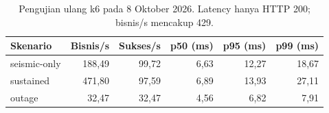\begin{table}[H]\centering\small
\begin{tabular}{lrrrrr}\toprule
Skenario & Bisnis/s & Sukses/s & p50 (ms) & p95 (ms) & p99 (ms)\\\midrule
seismic-only & 188,49 & 99,72 & 6,63 & 12,27 & 18,67\\
sustained & 471,80 & 97,59 & 6,89 & 13,93 & 27,11\\
outage & 32,47 & 32,47 & 4,56 & 6,82 & 7,91\\
\bottomrule\end{tabular}
\caption{Pengujian ulang k6 pada 8 Oktober 2026. Latency hanya HTTP 200; bisnis/s mencakup 429.}\end{table}
